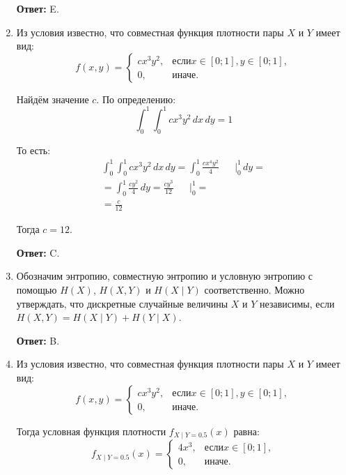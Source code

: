 \documentclass[a4paper]{article} %
\begin{document}
\begin{enumerate}
    \textbf{Ответ:} E.
    
    
    \item
    Из условия известно, что совместная функция плотности пары $X$ и $Y$ имеет вид:
    \[
    f(x, y) = 
    \begin{cases}
    cx^{3}y^{2}, & \text{если} x \in [0; 1], y \in [0; 1], \\
    0, & \text{иначе}.
    \end{cases}
    \]
    
    Найдём значение $c$.
    По определению:
    \[
    \int_{0}^{1}\int_{0}^{1} cx^{3}y^{2} \,dx\,dy = 1
    \]
    
    То есть:
    \begin{align*}
    	\int_{0}^{1}\int_{0}^{1} cx^{3}y^{2} \,dx\,dy = \int_{0}^{1} \frac{cx^{4}y^{2}}{4} \left.\begin{matrix} & \\ & \end{matrix}\right|_{0}^{1} \,dy = \\
    	= \int_{0}^{1} \frac{cy^{2}}{4} \,dy = \frac{cy^{3}}{12} \left.\begin{matrix} & \\ & \end{matrix}\right|_{0}^{1} = \\
    	= \frac{c}{12}
    \end{align*}
    
    Тогда $c = 12$.

    \textbf{Ответ:} C.
    
    
    \item
    Обозначим энтропию, совместную энтропию и условную энтропию с помощью $H(X)$, $H(X, Y)$ и $H(X \mid Y)$ соответственно.
    Можно утверждать, что дискретные случайные величины $X$ и $Y$ независимы, если $H(X, Y) = H(X \mid Y) + H(Y \mid X)$.
    
    \textbf{Ответ:} B.
    
    
    \item
    Из условия известно, что совместная функция плотности пары $X$ и $Y$ имеет вид:
    \[
    f(x, y) = 
    \begin{cases}
    cx^{3}y^{2}, & \text{если} x \in [0; 1], y \in [0; 1], \\
    0, & \text{иначе}.
    \end{cases}
    \]
    
    Тогда условная функция плотности $f_{X \mid Y = 0.5}(x)$ равна:
    \[
    f_{X \mid Y = 0.5}(x) =
    \begin{cases}
    4x^{3}, & \text{если} x \in [0; 1], \\
    0, & \text{иначе}.
    \end{cases}
    \]
    

\end{enumerate}
\end{document}
